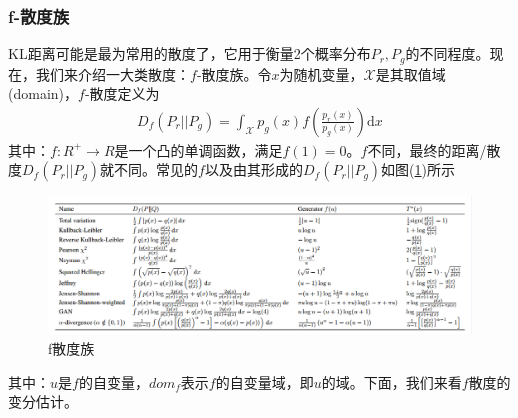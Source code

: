         \subsubsection{f-散度族}
            \par
            KL距离可能是最为常用的散度了，它用于衡量2个概率分布$P_r,P_g$的不同程度。现在，我们来介绍一大类散度：$f$-散度族。令$x$为随机变量，$\mathcal{X}$是其取值域(domain)，$f$-散度定义为
            \begin{align*}
            D_f(P_r||P_g) = \int_\mathcal{X}p_g(x)f \left( \frac{p_r(x)}{p_g(x)} \right) \mathrm{d}x
            \end{align*}
            其中：$f:R^+\to R$是一个凸的单调函数，满足$f(1) = 0$。$f$不同，最终的距离/散度$D_f(P_r||P_g)$就不同。常见的$f$以及由其形成的$D_f(P_r||P_g)$如图(\ref{fig:f散度族})所示
                \begin{figure}[H]
                \centering
                \includegraphics[width=15cm]{images/fsandu1.jpg}
                \caption{f散度族}
                \label{fig:f散度族}
                \end{figure}
            其中：$u$是$f$的自变量，$dom_f$表示$f$的自变量域，即$u$的域。下面，我们来看$f$散度的变分估计。
